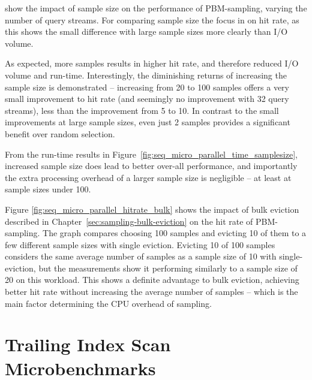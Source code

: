 show the impact of sample size on the performance of PBM-sampling, varying the number of query streams. For comparing sample size the focus in on hit rate, as this shows the small difference with large sample sizes more clearly than I/O volume.

As expected, more samples results in higher hit rate, and therefore reduced I/O volume and run-time. Interestingly, the diminishing returns of increasing the sample size is demonstrated -- increasing from 20 to 100 samples offers a very small improvement to hit rate (and seemingly no improvement with 32 query streams), less than the improvement from 5 to 10. In contrast to the small improvements at large sample sizes, even just 2 samples provides a significant benefit over random selection.

From the run-time results in Figure~\ref{fig:seq_micro_parallel_time_samplesize}, increased sample size does lead to better over-all performance, and importantly the extra processing overhead of a larger sample size is negligible -- at least at sample sizes under 100.

Figure \ref{fig:seq_micro_parallel_hitrate_bulk} shows the impact of bulk eviction described in Chapter~\ref{sec:sampling-bulk-eviction} on the hit rate of PBM-sampling. The graph compares choosing 100 samples and evicting 10 of them to a few different sample sizes with single eviction. Evicting 10 of 100 samples considers the same average number of samples as a sample size of 10 with single-eviction, but the measurements show it performing similarly to a sample size of 20 on this workload. This shows a definite advantage to bulk eviction, achieving better hit rate without increasing the average number of samples -- which is the main factor determining the CPU overhead of sampling.



\section{Trailing Index Scan Microbenchmarks}

